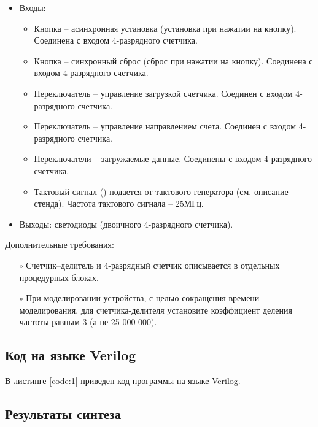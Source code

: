 \begin{itemize}
\begin{table}[H]
\end{table}	
\vspace{-0.5cm}
	\item Входы:
		\begin{itemize}
			\item Кнопка  -- асинхронная установка (установка при нажатии на кнопку). Соединена с входом  4-разрядного счетчика.
			\item Кнопка  -- синхронный сброс (сброс при нажатии на кнопку). Соединена с входом  4-разрядного счетчика.
			\item Переключатель  -- управление загрузкой счетчика. Соединен с входом  4-разрядного счетчика.
			\item Переключатель  -- управление направлением счета. Соединен с входом  4-разрядного счетчика.
			\item Переключатели  -- загружаемые данные. Соединены с входом  4-разрядного счетчика.
			\item Тактовый сигнал () подается от тактового генератора (см. описание стенда). Частота тактового сигнала – 25МГц.
		\end{itemize}
	\item Выходы: светодиоды  (двоичного 4-разрядного счетчика).
\end{itemize}

Дополнительные требования:
\begin{itemize}
	\item[$\circ$] Счетчик–делитель и 4-разрядный счетчик описывается в отдельных процедурных блоках.
	\item[$\circ$] При моделировании устройства, с целью сокращения времени моделирования, для счетчика-делителя установите коэффициент деления частоты равным 3 (а не 25 000 000).
\end{itemize}

\subsection{Код на языке Verilog}

В листинге \ref{code:1} приведен код программы на языке Verilog.



\subsection{Результаты синтеза}

